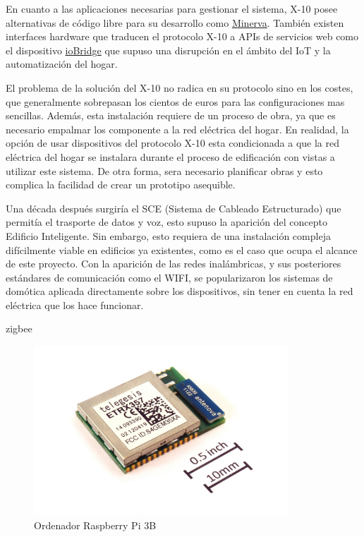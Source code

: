 \vspace{1.5cm}

En cuanto a las aplicaciones necesarias para gestionar el sistema, X-10 posee alternativas de código libre para su desarrollo como \href{http://www.minervahome.net/}{Minerva}. También existen interfaces hardware que traducen el protocolo X-10 a APIs de servicios web como el dispositivo \href{http://www.iobridge.com/}{ioBridge} que supuso una disrupción en el ámbito del IoT y la automatización del hogar.

\vspace{1.5cm}

El problema de la solución del X-10 no radica en su protocolo sino en los costes, que generalmente sobrepasan los cientos de euros para las configuraciones mas sencillas. Además, esta instalación requiere de un proceso de obra, ya que es necesario empalmar los componente a la red eléctrica del hogar. En realidad, la opción de usar dispositivos del protocolo X-10 esta condicionada a que la red eléctrica del hogar se instalara durante el proceso de edificación con vistas a utilizar este sistema. De otra forma, sera necesario planificar obras y esto complica la facilidad de crear un prototipo asequible.

\vspace{1.5cm}

Una década después surgiría el SCE (Sistema de Cableado Estructurado) que permitía el trasporte de datos y voz, esto supuso la aparición del concepto Edificio Inteligente. Sin embargo, esto requiera de una instalación compleja difícilmente viable en edificios ya existentes, como es el caso que ocupa el alcance de este proyecto. Con la aparición de las redes inalámbricas, y sus posteriores estándares de comunicación como el WIFI, se popularizaron los sistemas de domótica aplicada directamente sobre los dispositivos, sin tener en cuenta la red eléctrica que los hace funcionar.

zigbee
\begin{figure}[hbt!]
\centering
\includegraphics[height=2.5in]{figures/ETRX357_ZigBee_module_with_size_ref.jpg}
\caption[captura de una Raspberry]{Ordenador Raspberry Pi 3B\footnotemark}
\end{figure}



